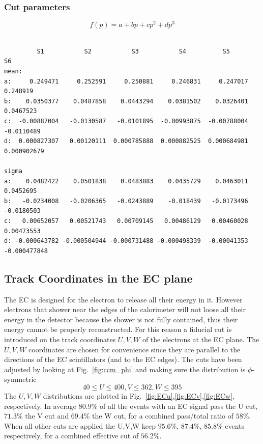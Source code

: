 \subsubsection{Cut parameters}\label{sec:ecp_parameters}
\vspace{1cm}
$$
f(p) = a + bp + cp^2 + dp^3
$$
\begin{verbatim}   

         S1           S2           S3           S4          S5            S6
mean:
a:     0.249471     0.252591     0.250881     0.246831     0.247017     0.248919
b:    0.0350377    0.0487858    0.0443294    0.0381502    0.0326401    0.0467523
c:  -0.00887004   -0.0130587   -0.0101895  -0.00993875  -0.00788004   -0.0110489
d:  0.000827307   0.00120111  0.000785888  0.000882525  0.000684981  0.000902679

sigma 
a:    0.0482422    0.0501838    0.0483883    0.0435729    0.0463011    0.0452695
b:   -0.0234008   -0.0206365   -0.0243889    -0.018439   -0.0173496   -0.0180503
c:   0.00652057   0.00521743   0.00709145   0.00486129   0.00460028   0.00473553
d: -0.000643782 -0.000504944 -0.000731488 -0.000498339  -0.00041353 -0.000477848
\end{verbatim}

\clearpage\newpage
\subsection{Track Coordinates in the EC plane}
The EC is designed for the electron to release all their energy in it.
However electrons that shower near the edges of the calorimeter will not loose
all their energy in the detector because the shower is not fully contained,
thus their energy cannot be properly reconstructed. For this reason 
a fiducial cut is introduced on the track coordinates $U,V,W$ 
of the electrons at the EC plane. The $U,V,W$ coordinates are chosen for 
convenience since they are parallel to the directions of the EC scintillators 
(and to the EC edges). The cuts have been adjusted by looking at Fig.~\ref{fig:ccm_phi}
and making sure the distribution is $\phi$-symmetric
$$
 40\leq U\leq400, V\leq362, W\leq395
$$
The $U,V,W$ distributions are plotted in Fig.~\ref{fig:ECu},\ref{fig:ECv},\ref{fig:ECw},
respectively. In average $80.9\%$ of all the events with an EC signal pass the U cut, $71.3\%$ the V cut
and $69.4\%$ the W cut, for a combined pass/total ratio of $58\%$.  When all other cuts are applied
the U,V,W keep $95.6\%$, $87.4\%$, $85.8\%$ events respectively, for a combined effective cut of $56.2\%$.

